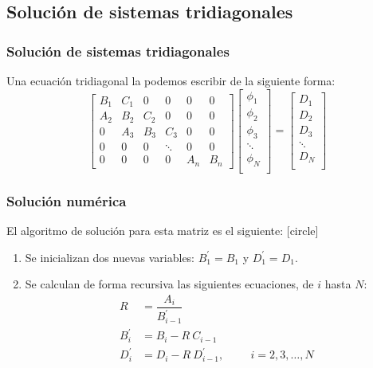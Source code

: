 \subsection{Solución de sistemas tridiagonales}
\begin{frame}
\frametitle{Solución de sistemas tridiagonales}
Una ecuación tridiagonal la podemos escribir de la siguiente forma:
\[
\begin{bmatrix}
B_{1} & C_{1} & 0 & 0 & 0 & 0 \\
A_{2} & B_{2} & C_{2} & 0 & 0 & 0 \\
0 & A_{3} & B_{3} & C_{3} & 0 & 0 \\
0 & 0 & 0 & \ddots & 0 & 0 \\
0 & 0 & 0 & 0 & A_{n}& B_{n} 
\end{bmatrix}
\begin{bmatrix}
\phi_{1} \\
\phi_{2} \\
\phi_{3} \\
\ddots \\
\phi_{N} \\
\end{bmatrix} =
\begin{bmatrix}
D_{1} \\
D_{2} \\
D_{3} \\
\ddots \\
D_{N} \\
\end{bmatrix}
\]
\end{frame}
\begin{frame}
\frametitle{Solución numérica}
El algoritmo de solución para esta matriz es el siguiente:
[circle]
\begin{enumerate}[<+->]
\item Se inicializan dos nuevas variables: $B^{\prime}_{1} = B_{1}$ y $D^{\prime}_{1} = D_{1}$.
\item Se calculan de forma recursiva las siguientes ecuaciones, de $i$ hasta $N$:
\[ \begin{split} R &= \dfrac{A_{i}}{B^{\prime}_{i-1}} \\
B^{\prime}_{i} &= B_{i} -R \: C_{i - 1} \\
D^{\prime}_{i} &= D_{i} - R \: D^{\prime}_{i - 1}, \hspace{1cm} i = 2, 3, \ldots, N
\end{split} \]
\seti
\end{enumerate}
\end{frame}
